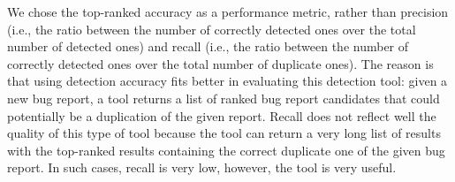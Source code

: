 




We chose the top-ranked accuracy as a performance metric, rather than
precision (i.e., the ratio between the number of correctly detected ones
over the total number of detected ones) and recall (i.e., the ratio
between the number of correctly detected ones over the total number of
duplicate ones). The reason is that using detection accuracy fits
better in evaluating this detection tool: given a new bug report, a
tool returns a list of ranked bug report candidates that could
potentially be a duplication of the given report.
Recall does not reflect well the quality of this type of tool because
the tool can return a very long list of results with the top-ranked
results containing the correct duplicate one of the given bug
report. In such cases, recall is very low, however, the tool is very
useful.


